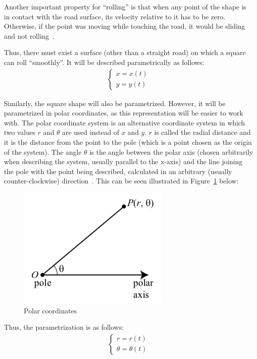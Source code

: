 \documentclass[12pt]{article}
\begin{document}
        Another important property for ``rolling'' is that when any point of the shape is in contact with the road surface, its velocity relative to it has to be zero. Otherwise, if the point was moving while touching the road, it would be sliding and not rolling~\cite{morphocular.2022}. 
        
        Thus, there must exist a surface (other than a straight road) on which a square can roll ``smoothly''. It will be described parametrically as follows:
        \begin{align}
            \begin{cases}
            x = x(t) \\
            y = y(t)
            \end{cases}
        \end{align}

        Similarly, the square shape will also be parametrized. However, it will be parametrized in polar coordinates, as this representation will be easier to work with. The polar coordinate system is an alternative coordinate system in which two values $r$ and $\theta$ are used instead of $x$ and $y$. $r$ is called the radial distance and it is the distance from the point to the pole (which is a point chosen as the origin of the system). The angle $\theta$ is the angle between the polar axis (chosen arbitrarily when describing the system, usually parallel to the x-axis) and the line joining the pole with the point being described, calculated in an arbitrary (usually counter-clockwise) direction~\cite{Sundstrom2021Polar}. This can be seen illustrated in Figure~\ref{fig:polar_definition} below:

        \begin{figure}[]
            \centering\includegraphics[width=0.3\linewidth]{images/polar_definition.png}
            \caption[Polar coordinate system]{Polar coordinates~\cite{Sundstrom2021Polar}}\label{fig:polar_definition}
        \end{figure}
        
        Thus, the parametrization is as follows: 
        \begin{align}
            \begin{cases}
            r = r(t) \\
            \theta = \theta(t)
            \end{cases}
        \end{align}
\end{document}
